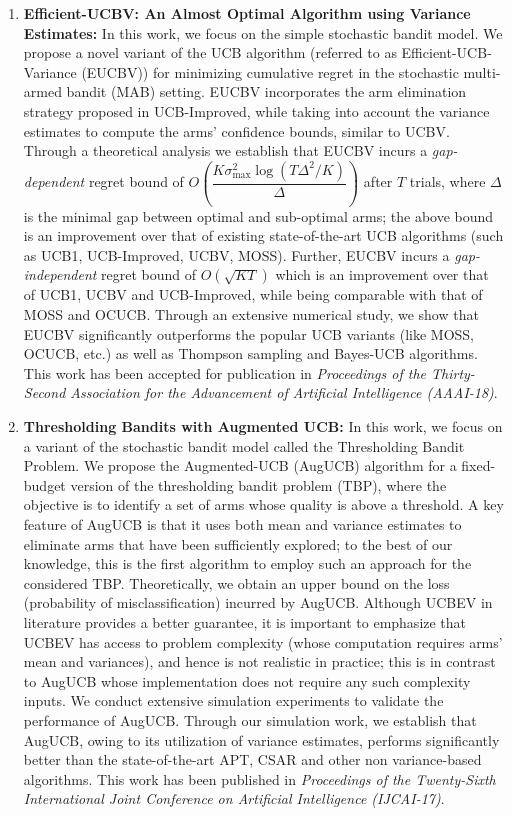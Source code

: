 \documentclass[twoside]{article}
\begin{document}
\begin{enumerate}
\item \textbf{Efficient-UCBV: An Almost Optimal Algorithm using Variance Estimates:} In this work, we focus on the simple stochastic bandit model. We propose a novel variant of the UCB algorithm (referred to as Efficient-UCB-Variance (EUCBV)) for minimizing cumulative regret in the stochastic multi-armed bandit (MAB) setting. EUCBV incorporates the arm elimination strategy proposed in UCB-Improved, while taking into account the variance estimates to compute the arms' confidence bounds, similar to UCBV. Through a theoretical analysis we establish that EUCBV incurs a \emph{gap-dependent} regret bound of  $O\left( \dfrac{K\sigma^2_{\max} \log (T\Delta^2 /K)}{\Delta}\right)$ after $T$ trials, where $\Delta$ is the minimal gap between optimal and sub-optimal arms; the above bound is an improvement over that of existing state-of-the-art UCB algorithms (such as UCB1, UCB-Improved, UCBV,  MOSS). Further, EUCBV incurs a \emph{gap-independent} regret bound of {$O\left(\sqrt{KT}\right)$}  which is an improvement over that of UCB1, UCBV and UCB-Improved, while being comparable with that of MOSS and OCUCB. Through an extensive numerical study, we show that EUCBV significantly outperforms the popular UCB variants (like MOSS, OCUCB, etc.) as well as Thompson sampling and Bayes-UCB algorithms. This work has been accepted for publication in \textit{Proceedings of the Thirty-Second Association for the Advancement of Artificial Intelligence (AAAI-18)}.

\item \textbf{Thresholding Bandits with Augmented UCB:} In this work, we focus on a variant of the stochastic bandit model called the Thresholding Bandit Problem. We propose the Augmented-UCB (AugUCB) algorithm for a fixed-budget version of the thresholding bandit problem (TBP), where the objective is to identify a set of arms whose quality is above a threshold. A key feature of AugUCB is that it uses both mean and variance estimates to eliminate arms that have been sufficiently explored; to the best of our knowledge, this is the first algorithm to employ such an approach for the considered TBP.  Theoretically, we obtain an upper bound on the loss (probability of misclassification) incurred by AugUCB. Although UCBEV in literature provides a better guarantee, it is important to emphasize that UCBEV has access to problem complexity (whose computation requires arms' mean and variances), and hence is not realistic in practice; this is in contrast to AugUCB whose implementation does not require any such complexity inputs. We conduct extensive simulation experiments to validate the performance of AugUCB. Through our simulation work, we establish that AugUCB, owing to its utilization of variance estimates, performs significantly better than the state-of-the-art APT, CSAR and other non variance-based algorithms. This work has been published in \textit{Proceedings of the Twenty-Sixth International Joint Conference on Artificial Intelligence (IJCAI-17)}.
\end{enumerate}
\end{document}
